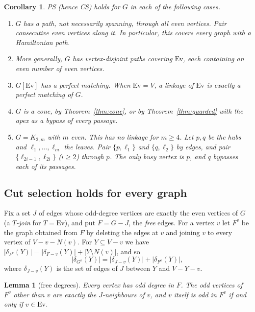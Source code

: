 \documentclass[11pt]{amsart}
\newtheorem{lemma}[theorem]{Lemma}
\newtheorem{corollary}[theorem]{Corollary}
\theoremstyle{definition}
\newcommand{\Ev}{\mathrm{Ev}}
\begin{document}
\begin{corollary}\label{cor:linkage}
PS (hence CS) holds for $G$ in each of the following cases.
\begin{enumerate}
\item $G$ has a path, not necessarily spanning, through all even vertices. Pair consecutive even
vertices along it. In particular, this covers every graph with a Hamiltonian path.
\item More generally, $G$ has vertex-disjoint paths covering $\Ev$, each containing an even number of
even vertices.
\item $G[\Ev]$ has a perfect matching. When $\Ev=V$, a linkage of $\Ev$ is exactly a perfect matching
of $G$.
\item $G$ is a cone, by Theorem~\ref{thm:cone}, or by Theorem~\ref{thm:guarded} with the apex as a
bypass of every passage.
\item $G=K_{2,m}$ with $m$ even. This has no linkage for $m\ge 4$. Let $p,q$ be the hubs and
$\ell_1,\dots,\ell_m$ the leaves. Pair $\{p,\ell_1\}$ and $\{q,\ell_2\}$ by edges, and pair
$\{\ell_{2i-1},\ell_{2i}\}$ ($i\ge 2$) through $p$. The only busy vertex is $p$, and $q$ bypasses each
of its passages.
\end{enumerate}
\end{corollary}

\subsection{Cut selection holds for every graph}

Fix a set $J$ of edges whose odd-degree vertices are exactly the even vertices of $G$ (a
\emph{$T$-join} for $T=\Ev$), and put $F=G-J$, the \emph{free} edges. For a vertex $v$ let $F^v$ be
the graph obtained from $F$ by deleting the edges at $v$ and joining $v$ to every vertex of
$V-v-N(v)$. For $Y\subseteq V-v$ we have
$|\delta_{F^v}(Y)|=|\delta_{F-v}(Y)|+|Y\setminus N(v)|$, and so
\begin{equation}\label{eq:split}
|\delta_{G^v}(Y)|=|\delta_{J-v}(Y)|+|\delta_{F^v}(Y)| ,
\end{equation}
where $\delta_{J-v}(Y)$ is the set of edges of $J$ between $Y$ and $V-Y-v$.

\begin{lemma}[free degrees]\label{lem:free}
Every vertex has odd degree in $F$. The odd vertices of $F^v$ other than $v$ are exactly the
$J$-neighbours of $v$, and $v$ itself is odd in $F^v$ if and only if $v\in\Ev$.
\end{lemma}
\end{document}
